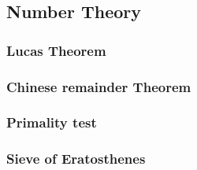 \documentclass[10pt,landscape,twocolumn]{article}
\begin{document}
\subsection{Number Theory}
\subsubsection{Lucas Theorem}
\subsubsection{Chinese remainder Theorem}
\subsubsection{Primality test}
\subsubsection{Sieve of Eratosthenes}

\end{document}
